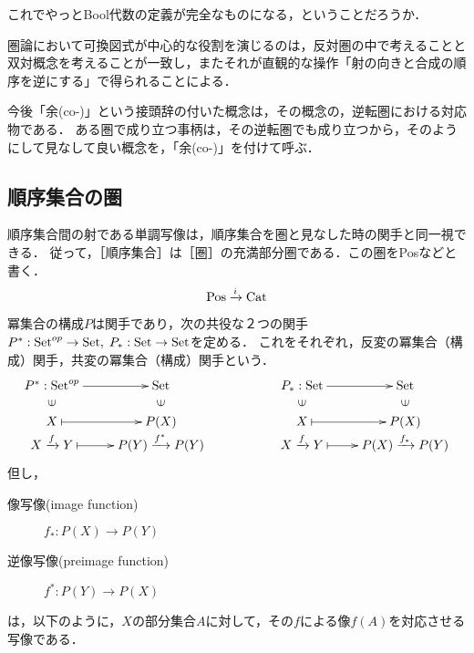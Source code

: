 \documentclass[uplatex, dvipdfmx]{jsreport}
\begin{document}
\begin{screen}
    これでやっとBool代数の定義が完全なものになる，ということだろうか．

    圏論において可換図式が中心的な役割を演じるのは，反対圏の中で考えることと双対概念を考えることが一致し，またそれが直観的な操作「射の向きと合成の順序を逆にする」で得られることによる．
\end{screen}

\begin{remark}
    今後「余(co-)」という接頭辞の付いた概念は，その概念の，逆転圏における対応物である．
    ある圏で成り立つ事柄は，その逆転圏でも成り立つから，そのようにして見なして良い概念を，「余(co-)」を付けて呼ぶ．
\end{remark}

\subsection{順序集合の圏}

\begin{definition}[Pos]
    順序集合間の射である単調写像は，順序集合を圏と見なした時の関手と同一視できる．
    従って，［順序集合］は［圏］の充満部分圏である．この圏をPosなどと書く．
    \[ \mathrm{Pos}\xrightarrow{i}\mathrm{Cat} \]
\end{definition}

\begin{definition}
    冪集合の構成$P$は関手であり，次の共役な２つの関手$P^*:\mathrm{Set}^{op}\to\mathrm{Set},\;P_*:\mathrm{Set}\to\mathrm{Set}$を定める．
    これをそれぞれ，反変の冪集合（構成）関手，共変の冪集合（構成）関手という．
    \[\xymatrix@R-2pc{
        P^*:\Set^{op}\ar[r]&\Set&&P_*:\Set\ar[r]&\Set\\
        {\rotatebox{90}{$\in$}}&{\rotatebox{90}{$\in$}}&&{\rotatebox{90}{$\in$}}&{\rotatebox{90}{$\in$}}\\
        X\ar@{|->}[r]&P(X)&&X\ar@{|->}[r]&P(X)\\
        {X\xrightarrow{f}Y}\ar@{|->}[r]&{P(Y)\xrightarrow{f^*}P(Y)}&&{X\xrightarrow{f}Y}\ar@{|->}[r]&{P(X)\xrightarrow{f_*}P(Y)}
    }\]
    但し，
    \begin{description}
        \item[像写像(image function)] $f_* : P(X)\rightarrow P(Y)$
        \item[逆像写像(preimage function)] $f^*:P(Y)\rightarrow P(X)$
    \end{description}
    は，以下のように，$X$の部分集合$A$に対して，その$f$による像$f(A)$を対応させる写像である．
    \begin{center}\end{center}
\end{definition}
\end{document}
